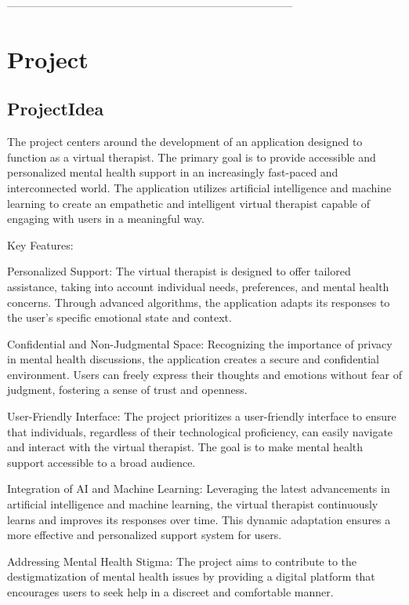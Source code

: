  ------------------------------------------------------------------------------
\chapter{Project} %
\section{ProjectIdea}
The project centers around the development of an application designed to function as a virtual therapist. The primary goal is to provide accessible and personalized mental health support in an increasingly fast-paced and interconnected world. The application utilizes artificial intelligence and machine learning to create an empathetic and intelligent virtual therapist capable of engaging with users in a meaningful way.

Key Features:

    Personalized Support: The virtual therapist is designed to offer tailored assistance, taking into account individual needs, preferences, and mental health concerns. Through advanced algorithms, the application adapts its responses to the user's specific emotional state and context.

    Confidential and Non-Judgmental Space: Recognizing the importance of privacy in mental health discussions, the application creates a secure and confidential environment. Users can freely express their thoughts and emotions without fear of judgment, fostering a sense of trust and openness.

    User-Friendly Interface: The project prioritizes a user-friendly interface to ensure that individuals, regardless of their technological proficiency, can easily navigate and interact with the virtual therapist. The goal is to make mental health support accessible to a broad audience.

    Integration of AI and Machine Learning: Leveraging the latest advancements in artificial intelligence and machine learning, the virtual therapist continuously learns and improves its responses over time. This dynamic adaptation ensures a more effective and personalized support system for users.

    Addressing Mental Health Stigma: The project aims to contribute to the destigmatization of mental health issues by providing a digital platform that encourages users to seek help in a discreet and comfortable manner.

